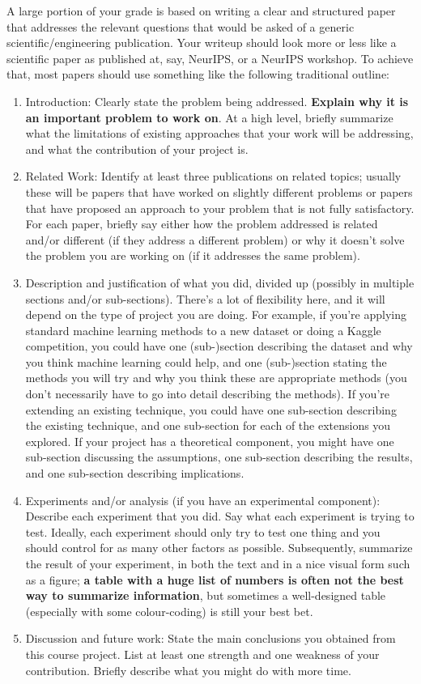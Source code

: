 \documentclass{article}
\begin{document}
A large portion of your grade is based on writing a clear and structured paper that addresses the relevant questions that would be asked of a generic scientific/engineering publication.
Your writeup should look more or less like a scientific paper as published at, say, NeurIPS,
or a NeurIPS workshop.
To achieve that, most papers should use something like the following traditional outline:
\begin{enumerate}
\item Introduction: Clearly state the problem being addressed. \textbf{Explain why it is an important problem to work on}. At a high level, briefly summarize what the limitations of existing approaches that your work will be addressing, and what the contribution of your project is.
\item Related Work: Identify at least three publications on related topics; usually these will be papers that have worked on slightly different problems or papers that have proposed an approach to your problem that is not fully satisfactory. For each paper, briefly say either how the problem addressed is related and/or different (if they address a different problem) or why it doesn't solve the problem you are working on (if it addresses the same problem).
\item Description and justification of what you did, divided up (possibly in multiple sections and/or sub-sections). There's a lot of flexibility here, and it will depend on the type of project you are doing. For example, if you're applying standard machine learning methods to a new dataset or doing a Kaggle competition, you could have one (sub-)section describing the dataset and why you think machine learning could help, and one (sub-)section stating the methods you will try and why you think these are appropriate methods (you don't necessarily have to go into detail describing the methods). If you're extending an existing technique, you could have one sub-section describing the existing technique, and one sub-section for each of the extensions you explored. If your project has a theoretical component, you might have one sub-section discussing the assumptions, one sub-section describing the results, and one sub-section describing implications.
\item Experiments and/or analysis (if you have an experimental component): Describe each experiment that you did. Say what each experiment is trying to test. Ideally, each experiment should only try to test one thing and you should control for as many other factors as possible. Subsequently, summarize the result of your experiment, in both the text and in a nice visual form such as a figure; \textbf{a table with a huge list of numbers is often not the best way to summarize information}, but sometimes a well-designed table (especially with some colour-coding) is still your best bet.
\item Discussion and future work: State the main conclusions you obtained from this course project. List at least one strength and one weakness of your contribution. Briefly describe what you might do with more time.
\end{enumerate}
\end{document}
